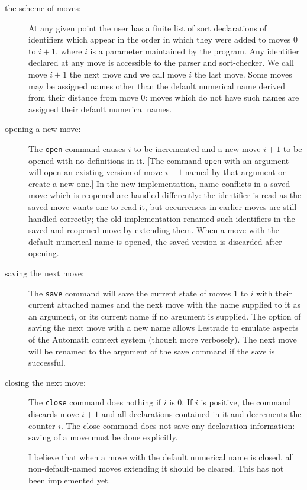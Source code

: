 \documentclass[12pt]{article}
\begin{document}
\begin{description}

\item[the scheme of moves:]  At any given point the user has a finite list of sort declarations of identifiers which appear in the order in which they were added to moves 0 to $i+1$, where $i$ is a parameter maintained by the program.   Any identifier declared at any move is accessible to the parser and sort-checker.  We call move $i+1$ the next move and we call move $i$ the last move.  Some moves may be assigned names other than the default numerical name derived from their distance from move 0:  moves which do not have such names are assigned their default numerical names.

\item[opening a new move:]  The {\tt open} command causes $i$ to be incremented and a new move $i+1$ to be opened with no definitions in it.  [The command
{\tt open} with an argument will open an existing version of move $i+1$ named by that argument or create a new one.]    In the new implementation, name conflicts in a saved move which is reopened are handled differently:  the identifier is read as the saved move wants one to read it, but occurrences in earlier moves are still handled correctly;  the old implementation renamed such identifiers in the saved and reopened move by extending them.  When a move with the default numerical name is opened, the saved version is discarded after opening.

\item[saving the next move:]  The {\tt save} command will save the current state of moves 1 to $i$ with their current attached names and the next move
with the name supplied to it as an argument, or its current name if no argument is supplied.
  The option of saving the next move with a new name allows Lestrade to emulate aspects of
the Automath context system (though more verbosely).  The next move will be renamed to the argument of the save command if the save is successful.

\item[closing the next move:]  The {\tt close} command does nothing if $i$ is 0.  If $i$ is positive, the command discards move $i+1$ and all declarations contained in it and decrements the counter $i$.  The close command does not save any declaration information:  saving of a move must be done explicitly.

I believe that when a move with the default numerical name is closed, all non-default-named moves extending it should be cleared.  This has not been implemented yet.


\end{description}
\end{document}
